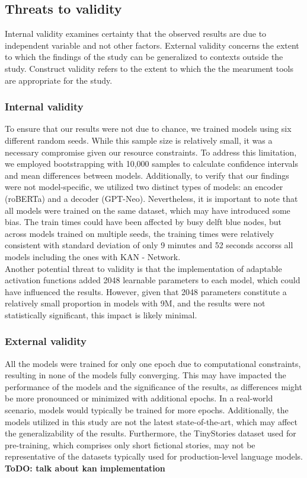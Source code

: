 \subsection{Threats to validity}
Internal validity examines certainty that the observed results are due to independent variable and not other factors. External validity concerns the extent to which the findings of the study can be generalized to contexts outside the study. Construct validity refers to the extent to which the the mearument tools are appropriate for the study. 

\subsubsection{Internal validity}
To ensure that our results were not due to chance, we trained models using six different random seeds. While this sample size is relatively small, it was a necessary compromise given our resource constraints. To address this limitation, we employed bootstrapping with 10,000 samples to calculate confidence intervals and mean differences between models. Additionally, to verify that our findings were not model-specific, we utilized two distinct types of models: an encoder (roBERTa) and a decoder (GPT-Neo). Nevertheless, it is important to note that all models were trained on the same dataset, which may have introduced some bias. The train times could have been affected by busy delft blue nodes, but across models trained on multiple seeds, the training times were relatively consistent with standard deviation of only 9 minutes and 52 seconds accorss all models including the ones with KAN - Network. \\ 
Another potential threat to validity is that the implementation of adaptable activation functions added 2048 learnable parameters to each model, which could have influenced the results. However, given that 2048 parameters constitute a relatively small proportion in models with 9M, and the results were not statistically significant, this impact is likely minimal.

\subsubsection{External validity}
All the models were trained for only one epoch due to computational constraints, resulting in none of the models fully converging. This may have impacted the performance of the models and the significance of the results, as differences might be more pronounced or minimized with additional epochs. In a real-world scenario, models would typically be trained for more epochs. Additionally, the models utilized in this study are not the latest state-of-the-art, which may affect the generalizability of the results. Furthermore, the TinyStories dataset used for pre-training, which comprises only short fictional stories, may not be representative of the datasets typically used for production-level language models.
\textbf{ToDO: talk about kan implementation}
